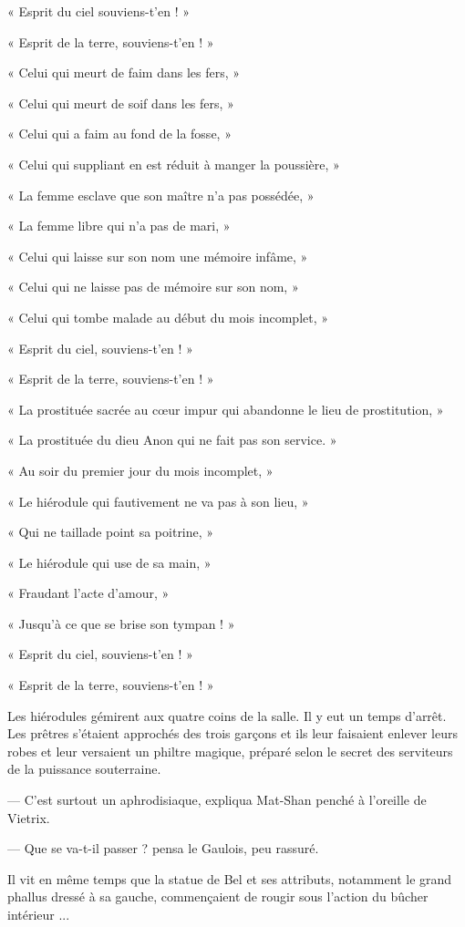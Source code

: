 \documentclass[a4paper, 11pt, oneside, polutonikogreek, french]{article}
\begin{document}
« Esprit du ciel souviens-t'en ! »

« Esprit de la terre, souviens-t'en ! »

« Celui qui meurt de faim dans les fers, »

« Celui qui meurt de soif dans les fers, »

« Celui qui a faim au fond de la fosse, »

« Celui qui suppliant en est réduit à manger la poussière, »

« La femme esclave que son maître n'a pas possédée, »

« La femme libre qui n'a pas de mari, »

« Celui qui laisse sur son nom une mémoire infâme, »

« Celui qui ne laisse pas de mémoire sur son nom, »

« Celui qui tombe malade au début du mois incomplet, »

« Esprit du ciel, souviens-t'en ! »

« Esprit de la terre, souviens-t'en ! »

« La prostituée sacrée au cœur impur qui abandonne le lieu de prostitution, »

« La prostituée du dieu Anon qui ne fait pas son service. »

« Au soir du premier jour du mois incomplet, »

« Le hiérodule qui fautivement ne va pas à son lieu, »

« Qui ne taillade point sa poitrine, »

« Le hiérodule qui use de sa main, »

« Fraudant l'acte d'amour, »

« Jusqu'à ce que se brise son tympan ! »

« Esprit du ciel, souviens-t'en ! »

« Esprit de la terre, souviens-t'en ! »

Les hiérodules gémirent aux quatre coins de la salle. Il y eut un temps d'arrêt. Les prêtres s'étaient approchés des trois garçons et ils leur faisaient enlever leurs robes et leur versaient un philtre magique, préparé selon le secret des serviteurs de la puissance souterraine.

--- C'est surtout un aphrodisiaque, expliqua Mat-Shan penché à l'oreille de Vietrix.

--- Que se va-t-il passer ? pensa le Gaulois, peu rassuré.

Il vit en même temps que la statue de Bel et ses attributs, notamment le grand phallus dressé à sa gauche, commençaient de rougir sous l'action du bûcher intérieur ...
\end{document}
